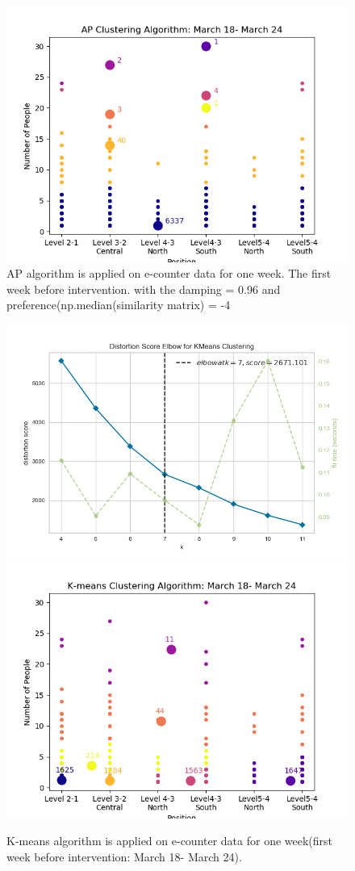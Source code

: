 \begin{figure}[!h]
    \centering
    \includegraphics[width = 11 cm]{image/Chapters/Chapter6/ApFirstWeekBeforeInt.png}
    \caption{AP algorithm is applied on e-counter data for one week. The first week before intervention. with the damping = 0.96 and preference(np.median(similarity matrix) = -4 }
    \label{befA}
\end{figure}



\begin{figure}[!h]
    \centering
    \includegraphics[width=.49\textwidth]{image/Chapters/Chapter6/elbowBeforerInt.png}
    \includegraphics[width=.49\textwidth]{image/Chapters/Chapter6/kmeans1WeekBefore.png}
    \caption{K-means algorithm is applied on e-counter data for one week(first week before intervention: March 18- March 24).}
    \label{beforAPp}
\end{figure}   
   




